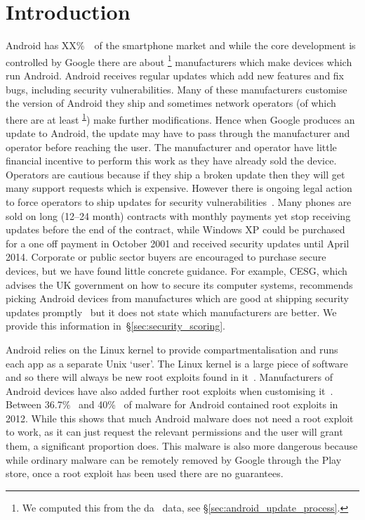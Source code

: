 \documentclass[conference,a4paper,twoside]{IEEEtran}
\newcommand{\percMarketShare}{XX\%~\cite{TODO}}
\begin{document}
\section{Introduction}
Android has \percMarketShare\ of the smartphone market and while the core development is controlled by Google there are about \daNumManufacturers\footnote{\label{foot:dadata}We computed this from the da~\cite{Wagner2013} data, see \S\ref{sec:android_update_process}.} manufacturers which make devices which run Android.
Android receives regular updates  which add new features and fix bugs, including security vulnerabilities.
Many of these manufacturers customise the version of Android they ship and sometimes network operators (of which there are at least \daNumOperators\textsuperscript{\ref{foot:dadata}}) make further modifications.
Hence when Google produces an update to Android, the update may have to pass through the manufacturer and operator before reaching the user.
The manufacturer and operator have little financial incentive to perform this work as they have already sold the device.
Operators are cautious because if they ship a broken update then they will get many support requests which is expensive.
However there is ongoing legal action to force operators to ship updates for security vulnerabilities~\cite{Soghoian2013}.
Many phones are sold on long (12--24 month) contracts with monthly payments yet stop receiving updates before the end of the contract, while Windows XP could be purchased for a one off payment in October 2001 and received security updates until April 2014.
Corporate or public sector buyers are encouraged to purchase secure devices, but we have found little concrete guidance. For example, CESG, which advises the UK government on how to secure its computer systems, recommends picking Android devices from manufactures which are good at shipping security updates promptly~\cite{CESG2013} but it does not state which manufacturers are better.
We provide this information in~\S\ref{sec:security_scoring}.

Android relies on the Linux kernel to provide compartmentalisation and runs each app as a separate Unix `user'.
The Linux kernel is a large piece of software and so there will always be new root exploits found in it~\cite{TODO}.
Manufacturers of Android devices have also added further root exploits when customising it~\cite{Grace2012}.
Between 36.7\%~\cite{Zhou2012b} and 40\%~\cite{Zhou2012a} of malware for Android contained root exploits in 2012.
While this shows that much Android malware does not need a root exploit to work, as it can just request the relevant permissions and the user will grant them, a significant proportion does.
This malware is also more dangerous because while ordinary malware can be remotely removed by Google through the Play store, once a root exploit has been used there are no guarantees.
\end{document}

